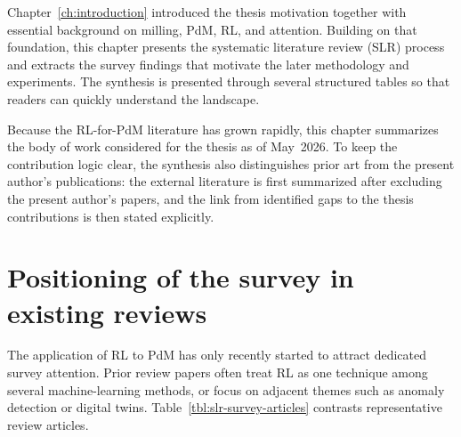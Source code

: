 \documentclass[12pt,oneside]{book}
\begin{document}
Chapter~\ref{ch:introduction} introduced the thesis motivation together with essential background on milling, PdM, RL, and attention. Building on that foundation, this chapter presents the systematic literature review (SLR) process and extracts the survey findings that motivate the later methodology and experiments. The synthesis is presented through several structured tables so that readers can quickly understand the landscape.

Because the RL-for-PdM literature has grown rapidly, this chapter summarizes the body of work considered for the thesis as of May~2026. To keep the contribution logic clear, the synthesis also distinguishes prior art from the present author's publications: the external literature is first summarized after excluding the present author's papers, and the link from identified gaps to the thesis contributions is then stated explicitly.

\section{Positioning of the survey in existing reviews}
The application of RL to PdM has only recently started to attract dedicated survey attention. Prior review papers often treat RL as one technique among several machine-learning methods, or focus on adjacent themes such as anomaly detection or digital twins. Table~\ref{tbl:slr-survey-articles} contrasts representative review articles.
\end{document}
